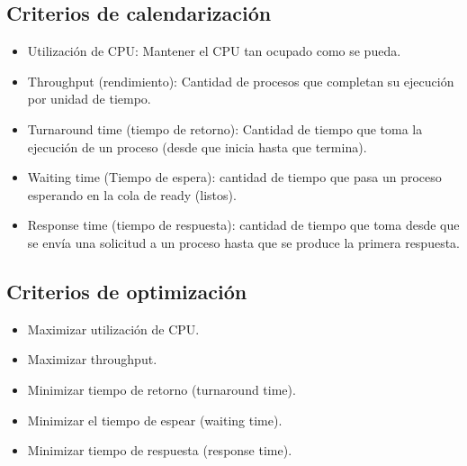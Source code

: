 \documentclass[a4paper, 11pt]{article}
\begin{document}
\subsection{Criterios de calendarización}
\begin{itemize}
    \item Utilización de CPU: Mantener el CPU tan ocupado como se pueda.
    \item Throughput (rendimiento): Cantidad de procesos que completan su ejecución por unidad de tiempo.
    \item Turnaround time (tiempo de retorno): Cantidad de tiempo que toma la ejecución de un proceso (desde que inicia hasta que termina).
    \item Waiting time (Tiempo de espera): cantidad de tiempo que pasa un proceso esperando en la cola de ready (listos).
    \item Response time (tiempo de respuesta): cantidad de tiempo que toma desde que se envía una solicitud a un proceso hasta que se produce la primera respuesta.
\end{itemize}



\subsection {Criterios de optimización}
\begin{itemize}
    \item Maximizar utilización de CPU.
    \item Maximizar throughput.
    \item Minimizar tiempo de retorno (turnaround time).
    \item Minimizar el tiempo de espear (waiting time).
    \item Minimizar tiempo de respuesta (response time).
\end{itemize}
\end{document}
